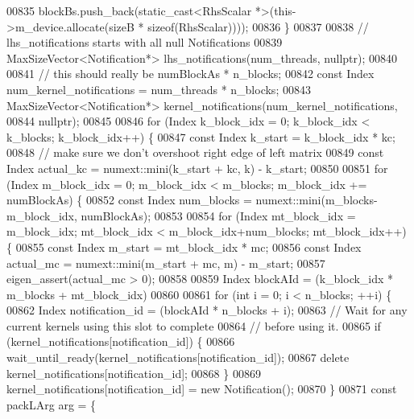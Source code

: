 \begin{DoxyCode}
{00835       blockBs.push\_back(static\_cast<RhsScalar *>(this->m\_device.allocate(sizeB * \textcolor{keyword}{sizeof}(RhsScalar))));
00836     \}
00837 
00838     \textcolor{comment}{// lhs\_notifications starts with all null Notifications}
00839     MaxSizeVector<Notification*> lhs\_notifications(num\_threads, \textcolor{keyword}{nullptr});
00840 
00841     \textcolor{comment}{// this should really be numBlockAs * n\_blocks;}
00842     \textcolor{keyword}{const} Index num\_kernel\_notifications = num\_threads * n\_blocks;
00843     MaxSizeVector<Notification*> kernel\_notifications(num\_kernel\_notifications,
00844                                                     \textcolor{keyword}{nullptr});
00845 
00846     \textcolor{keywordflow}{for} (Index k\_block\_idx = 0; k\_block\_idx < k\_blocks; k\_block\_idx++) \{
00847       \textcolor{keyword}{const} Index k\_start = k\_block\_idx * kc;
00848       \textcolor{comment}{// make sure we don't overshoot right edge of left matrix}
00849       \textcolor{keyword}{const} Index actual\_kc = numext::mini(k\_start + kc, k) - k\_start;
00850 
00851       \textcolor{keywordflow}{for} (Index m\_block\_idx = 0; m\_block\_idx < m\_blocks; m\_block\_idx += numBlockAs) \{
00852         \textcolor{keyword}{const} Index num\_blocks = numext::mini(m\_blocks-m\_block\_idx, numBlockAs);
00853 
00854         \textcolor{keywordflow}{for} (Index mt\_block\_idx = m\_block\_idx; mt\_block\_idx < m\_block\_idx+num\_blocks; mt\_block\_idx++) \{
00855           \textcolor{keyword}{const} Index m\_start = mt\_block\_idx * mc;
00856           \textcolor{keyword}{const} Index actual\_mc = numext::mini(m\_start + mc, m) - m\_start;
00857           eigen\_assert(actual\_mc > 0);
00858 
00859           Index blockAId = (k\_block\_idx * m\_blocks + mt\_block\_idx) %
00860 
00861           \textcolor{keywordflow}{for} (\textcolor{keywordtype}{int} i = 0; i < n\_blocks; ++i) \{
00862             Index notification\_id = (blockAId * n\_blocks + i);
00863             \textcolor{comment}{// Wait for any current kernels using this slot to complete}
00864             \textcolor{comment}{// before using it.}
00865             \textcolor{keywordflow}{if} (kernel\_notifications[notification\_id]) \{
00866               wait\_until\_ready(kernel\_notifications[notification\_id]);
00867               \textcolor{keyword}{delete} kernel\_notifications[notification\_id];
00868             \}
00869             kernel\_notifications[notification\_id] = \textcolor{keyword}{new} Notification();
00870           \}
00871           \textcolor{keyword}{const} packLArg arg = \{
}
\end{DoxyCode}
